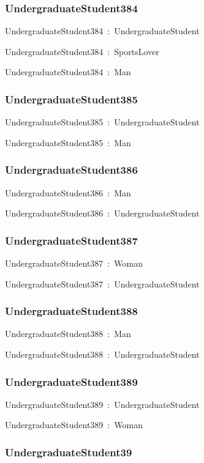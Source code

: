 \documentclass{article}
\begin{document}
\subsubsection*{UndergraduateStudent384}

UndergraduateStudent384~:~UndergraduateStudent

UndergraduateStudent384~:~SportsLover

UndergraduateStudent384~:~Man

\subsubsection*{UndergraduateStudent385}

UndergraduateStudent385~:~UndergraduateStudent

UndergraduateStudent385~:~Man

\subsubsection*{UndergraduateStudent386}

UndergraduateStudent386~:~Man

UndergraduateStudent386~:~UndergraduateStudent

\subsubsection*{UndergraduateStudent387}

UndergraduateStudent387~:~Woman

UndergraduateStudent387~:~UndergraduateStudent

\subsubsection*{UndergraduateStudent388}

UndergraduateStudent388~:~Man

UndergraduateStudent388~:~UndergraduateStudent

\subsubsection*{UndergraduateStudent389}

UndergraduateStudent389~:~UndergraduateStudent

UndergraduateStudent389~:~Woman

\subsubsection*{UndergraduateStudent39}
\end{document}

